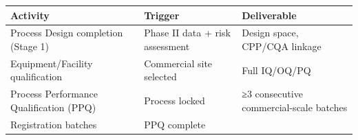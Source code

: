 \documentclass[
  11pt,
  a4paper,
]{report}
\begin{document}
\begin{longtable}[]{@{}lll@{}}
\toprule
\begin{minipage}[b]{0.29\columnwidth}\raggedright
Activity\strut
\end{minipage} & \begin{minipage}[b]{0.26\columnwidth}\raggedright
Trigger\strut
\end{minipage} & \begin{minipage}[b]{0.37\columnwidth}\raggedright
Deliverable\strut
\end{minipage}\tabularnewline
\midrule
\endhead
\begin{minipage}[t]{0.29\columnwidth}\raggedright
Process Design completion (Stage 1)\strut
\end{minipage} & \begin{minipage}[t]{0.26\columnwidth}\raggedright
Phase II data + risk assessment\strut
\end{minipage} & \begin{minipage}[t]{0.37\columnwidth}\raggedright
Design space, CPP/CQA linkage\strut
\end{minipage}\tabularnewline
\begin{minipage}[t]{0.29\columnwidth}\raggedright
Equipment/Facility qualification\strut
\end{minipage} & \begin{minipage}[t]{0.26\columnwidth}\raggedright
Commercial site selected\strut
\end{minipage} & \begin{minipage}[t]{0.37\columnwidth}\raggedright
Full IQ/OQ/PQ\strut
\end{minipage}\tabularnewline
\begin{minipage}[t]{0.29\columnwidth}\raggedright
Process Performance Qualification (PPQ)\strut
\end{minipage} & \begin{minipage}[t]{0.26\columnwidth}\raggedright
Process locked\strut
\end{minipage} & \begin{minipage}[t]{0.37\columnwidth}\raggedright
≥3 consecutive commercial-scale batches\strut
\end{minipage}\tabularnewline
\begin{minipage}[t]{0.29\columnwidth}\raggedright
Registration batches\strut
\end{minipage} & \begin{minipage}[t]{0.26\columnwidth}\raggedright
PPQ complete\strut
\end{minipage} & \begin{minipage}[t]{0.37\columnwidth}\raggedright

\end{minipage}
\end{longtable}
\end{document}
